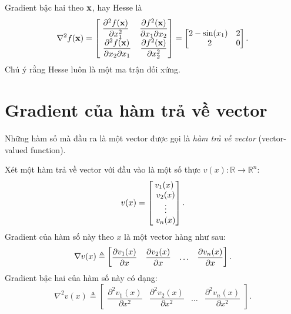Gradient bậc hai theo $\mathbf{x}$, hay Hesse là
$$
\nabla^2 f(\mathbf{x}) =
\left[\begin{matrix}
\dfrac{\partial^2 f(\mathbf{x})}{\partial x_1^2} & \dfrac{\partial f^2(\mathbf{x})}{\partial x_1\partial x_2} \\\
\dfrac{\partial^2 f(\mathbf{x})}{\partial x_2\partial x_1} & \dfrac{\partial f^2(\mathbf{x})}{\partial x_2^2}
\end{matrix}\right] =
\left[\begin{matrix}
2 - \sin(x_1) & 2 \\\
2 & 0
\end{matrix}\right].$$
Chú ý rằng {Hesse} luôn là một ma trận đối xứng.


\section{Gradient của hàm trả về vector }

Những hàm số mà đầu ra là một vector được gọi là \textit{hàm trả về vector} (vector-valued function).

Xét một hàm trả về vector với đầu vào là một số thực $v(x):
\mathbb{R} \rightarrow
\mathbb{R}^n $:
\smallvspace
\begin{equation}
\label{eqn:vectorvalued}
v(x) =
\left[\begin{matrix}
v_1(x) \\\
v_2(x) \\\
\vdots \\\
v_n(x)
\end{matrix}\right].
\end{equation}
Gradient của hàm số này theo $x$ là một {vector hàng} như sau:
\begin{equation}
\label{eqn:grvectorvalued}
\nabla v(x) \triangleq
\left[\begin{matrix}
\dfrac{\partial v_1(x)}{\partial x} & \dfrac{\partial v_2(x)}{\partial x} &
\dots & \dfrac{\partial v_n(x)}{\partial x}
\end{matrix}\right].
\end{equation}
Gradient bậc hai của hàm số này có dạng:
\begin{equation}
\label{eqn:hessianvectorvalued}
\nabla^2 v(x) \triangleq
\left[
\begin{matrix}
\dfrac{\partial^2 v_1(x)}{\partial x^2} & \dfrac{\partial^2 v_2(x)}{\partial x^2} & \dots & \dfrac{\partial^2 v_n(x)}{\partial x^2}
\end{matrix}
\right].
\end{equation}

